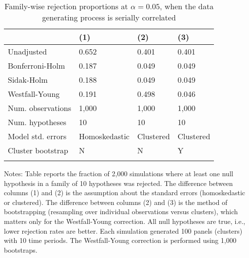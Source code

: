 \documentclass{article}
\begin{document}
\begin{table}[tbp] \centering
{}

\caption{Family-wise rejection proportions at \(\alpha = 0.05\), when the data generating process is serially correlated}
\label{tab:wyoung2}
\begin{tabularx}{\linewidth}{lCCC}

\toprule
&{(1)}&{(2)}&{(3)} \tabularnewline
\midrule \addlinespace[\belowrulesep]
Unadjusted&0.652&0.401&0.401 \tabularnewline
Bonferroni-Holm&0.187&0.049&0.049 \tabularnewline
Sidak-Holm&0.188&0.049&0.049 \tabularnewline
Westfall-Young&0.191&0.498&0.046 \tabularnewline
\midrule Num. observations&1,000&1,000&1,000 \tabularnewline
Num. hypotheses&10&10&10 \tabularnewline
Model std. errors&Homoskedastic&Clustered&Clustered \tabularnewline
Cluster bootstrap&N&N&Y \tabularnewline
\bottomrule \addlinespace[\belowrulesep]

\end{tabularx}
\begin{flushleft}
\footnotesize Notes: Table reports the fraction of 2,000 simulations where at least one null hypothesis in a family of 10 hypotheses was rejected. The difference between columns (1) and (2) is the assumption about the standard errors (homoskedastic or clustered). The difference between columns (2) and (3) is the method of bootstrapping (resampling over individual observations versus clusters), which matters only for the Westfall-Young correction. All null hypotheses are true, i.e., lower rejection rates are better. Each simulation generated 100 panels (clusters) with 10 time periods. The Westfall-Young correction is performed using 1,000 bootstraps.
\end{flushleft}
\end{table}
\end{document}
